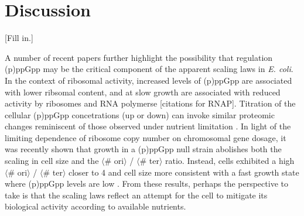\section{Discussion}

[Fill in.]



%


A number of recent papers further highlight the possibility that regulation
(p)ppGpp may be the critical component of the apparent scaling laws in
\textit{E. coli}. In the context of ribosomal activity, increased levels of
(p)ppGpp are associated with lower ribsomal content, and at slow growth
are associated with reduced activity by ribosomes and RNA polymerse \citep{dai2016,
dai2018} [citations for RNAP]. Titration of the cellular (p)ppGpp concetrations (up or down) can
invoke similar proteomic changes reminiscent of those observed under nutrient
limitation \citep{zhu2019}. In light of the limiting dependence of ribosome copy
number on chromosomal gene dosage, it was recently shown that growth in a
(p)ppGpp null strain abolishes both the scaling in cell size  and the
$\langle$\# ori$\rangle$ / $\langle$\# ter$\rangle$ ratio. Instead, cells
exhibited a high $\langle$\# ori$\rangle$ / $\langle$\# ter$\rangle$ closer to 4
and cell size more consistent with a fast growth state where (p)ppGpp levels are
low \citep{fernandezcoll2020}. From these results, perhaps the perspective to
take is that the scaling laws  reflect an attempt for the cell to mitigate its
biological activity according  to available nutrients.
